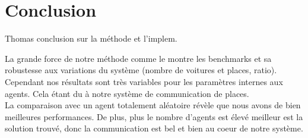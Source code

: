 \section*{Conclusion}
\label{sec:conclusion}

Thomas conclusion sur la méthode et l'implem.

La grande force de notre méthode comme le montre les benchmarks et sa robustesse
aux variations du système (nombre de voitures et places, ratio). Cependant nos
résultats sont très variables pour les paramètres internes aux agents. Cela étant
du à notre système de communication de places.\\

La comparaison avec un agent totalement aléatoire révèle que nous avons de bien meilleures
performances. De plus, plus le nombre d'agents est élevé meilleur est la solution trouvé, donc
la communication est bel et bien au coeur de notre système.


